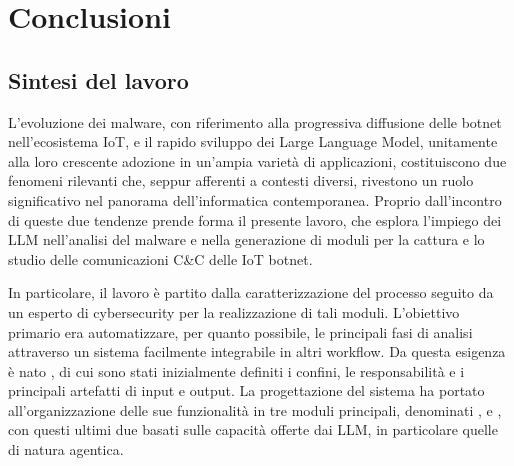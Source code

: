 \chapter{Conclusioni} \label{chap:conclusioni} %

\section{Sintesi del lavoro}

L'evoluzione dei malware, con riferimento alla progressiva diffusione delle botnet nell'ecosistema IoT, e il rapido sviluppo dei Large Language Model, unitamente alla loro crescente adozione in un'ampia varietà di applicazioni, costituiscono due fenomeni rilevanti che, seppur afferenti a contesti diversi, rivestono un ruolo significativo nel panorama dell'informatica contemporanea. Proprio dall'incontro di queste due tendenze prende forma il presente lavoro, che esplora l'impiego dei LLM nell'analisi del malware e nella generazione di moduli per la cattura e lo studio delle comunicazioni C\&C delle IoT botnet.






In particolare, il lavoro è partito dalla caratterizzazione del processo seguito da un esperto di cybersecurity per la realizzazione di tali moduli. L'obiettivo primario era automatizzare, per quanto possibile, le principali fasi di analisi attraverso un sistema facilmente integrabile in altri workflow. Da questa esigenza è nato \system{}, di cui sono stati inizialmente definiti i confini, le responsabilità e i principali artefatti di input e output. La progettazione del sistema ha portato all'organizzazione delle sue funzionalità in tre moduli principali, denominati \classifier{}, \sreagent{} e \codeagent{}, con questi ultimi due basati sulle capacità offerte dai LLM, in particolare quelle di natura agentica.

